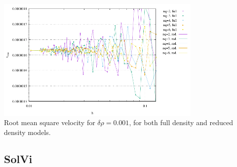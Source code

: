 \begin{center}
\includegraphics[width=10cm]{python_codes/fieldstone_80/results/sphere/vrms}\\
{\captionfont Root mean square velocity for $\delta \rho=0.001$, for both full density and reduced 
density models.}
\end{center}


\subsection*{SolVi}

